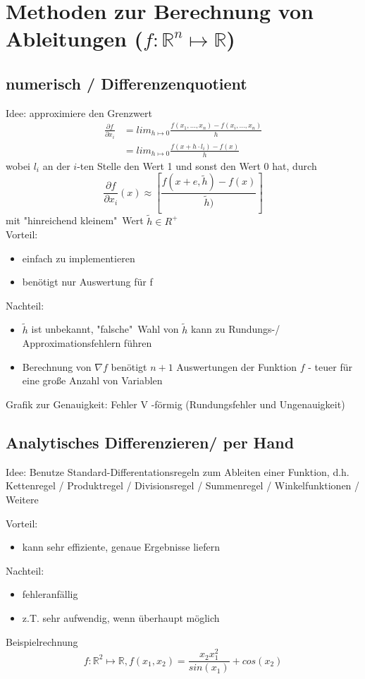 \section{Methoden zur Berechnung von Ableitungen ($f: \mathbb{R}^n \mapsto \mathbb{R}$)}


\subsection{numerisch / Differenzenquotient}
\label{subsec:numerisch / Differenzenquotient}
Idee: approximiere den Grenzwert
\begin{align*}
\frac{\partial f}{\partial x_i} & = lim_{h\mapsto 0} \frac{f(x_1,\dots,x_n) - f(x_i,\dots,x_n)}{h}\\
 &= lim_{h\mapsto 0} \frac{f(x+h \cdot l_i) - f(x)}{h}
\end{align*}
wobei $l_i$ an der $i$-ten Stelle den Wert 1 und sonst den Wert 0 hat, durch 
$$\frac{\partial f}{\partial x_i}(x) \approx \left[\frac{f(x+e,\tilde h)-f(x)}{\tilde h)}\right]$$
mit "hinreichend kleinem"\ Wert $\tilde h \in R^+$
\\
Vorteil:
\begin{itemize}
	\item einfach zu implementieren
	\item benötigt nur Auswertung für f
\end{itemize}
Nachteil:
\begin{itemize}
	\item $\tilde h$ ist unbekannt, "falsche"\ Wahl von $\tilde h$ kann zu Rundungs-/ Approximationsfehlern führen
	\item Berechnung von $\nabla f$ benötigt $n+1$ Auswertungen der Funktion $f$ - teuer für eine große Anzahl von Variablen
\end{itemize}
Grafik zur Genauigkeit: Fehler V -förmig (Rundungsfehler und Ungenauigkeit)

\vspace{3cm}

\subsection{Analytisches Differenzieren/ per Hand}
Idee: Benutze Standard-Differentationsregeln zum Ableiten einer Funktion, d.h. Kettenregel / Produktregel / Divisionsregel / Summenregel / Winkelfunktionen / Weitere

\noindent Vorteil:
\begin{itemize}
	\item kann sehr effiziente, genaue Ergebnisse liefern
\end{itemize}
Nachteil:
\begin{itemize}
	\item fehleranfällig
	\item z.T. sehr aufwendig, wenn überhaupt möglich
\end{itemize}
Beispielrechnung
$$f:\mathbb{R}^2\mapsto\mathbb{R}, f(x_1,x_2) = \frac{x_2 x_1^2}{sin(x_1)}+cos(x_2)$$

